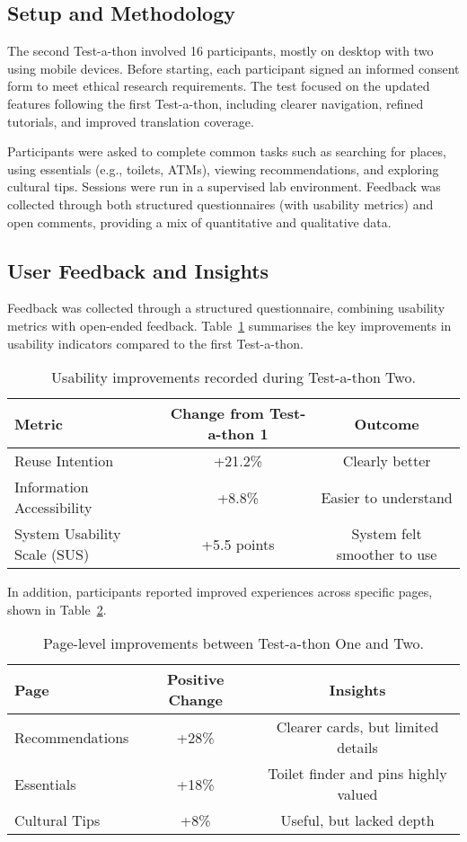 \subsection{Setup and Methodology}

The second Test-a-thon involved 16 participants, mostly on desktop with two using mobile devices. 
Before starting, each participant signed an informed consent form to meet ethical research requirements. 
The test focused on the updated features following the first Test-a-thon, including clearer navigation, 
refined tutorials, and improved translation coverage. 

Participants were asked to complete common tasks such as searching for places, using essentials (e.g., toilets, ATMs), 
viewing recommendations, and exploring cultural tips. Sessions were run in a supervised lab environment. 
Feedback was collected through both structured questionnaires (with usability metrics) and open comments, 
providing a mix of quantitative and qualitative data.

\subsection{User Feedback and Insights}
Feedback was collected through a structured questionnaire, combining usability metrics with open-ended feedback. Table~\ref{tab:usability-metrics} summarises the key improvements in usability indicators compared to the first Test-a-thon.

\begin{table}[H]
\centering
\small
\begin{tabular}{lcc}
\toprule
\textbf{Metric} & \textbf{Change from Test-a-thon 1} & \textbf{Outcome} \\
\midrule
Reuse Intention & +21.2\% & Clearly better \\
Information Accessibility & +8.8\% & Easier to understand \\
System Usability Scale (SUS) & +5.5 points & System felt smoother to use \\
\bottomrule
\end{tabular}
\caption{Usability improvements recorded during Test-a-thon Two.}
\label{tab:usability-metrics}
\end{table}

In addition, participants reported improved experiences across specific pages, shown in Table~\ref{tab:page-performance}.

\begin{table}[H]
\centering
\small
\begin{tabular}{lcc}
\toprule
\textbf{Page} & \textbf{Positive Change} & \textbf{Insights} \\
\midrule
Recommendations & +28\% & Clearer cards, but limited details \\
Essentials & +18\% & Toilet finder and pins highly valued \\
Cultural Tips & +8\% & Useful, but lacked depth \\
\bottomrule
\end{tabular}
\caption{Page-level improvements between Test-a-thon One and Two.}
\label{tab:page-performance}
\end{table}

